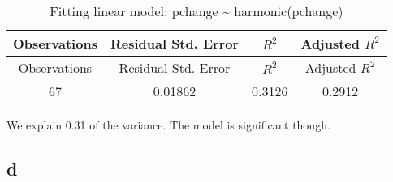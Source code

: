 \documentclass[]{book}
\theoremstyle{definition}
\theoremstyle{definition}
\theoremstyle{remark}
\begin{document}
\begin{longtable}[c]{@{}cccc@{}}
\caption{Fitting linear model: pchange \textasciitilde{}
harmonic(pchange)}\tabularnewline
\toprule
\begin{minipage}[b]{0.18\columnwidth}\centering\strut
Observations
\strut\end{minipage} &
\begin{minipage}[b]{0.27\columnwidth}\centering\strut
Residual Std. Error
\strut\end{minipage} &
\begin{minipage}[b]{0.10\columnwidth}\centering\strut
\(R^2\)
\strut\end{minipage} &
\begin{minipage}[b]{0.20\columnwidth}\centering\strut
Adjusted \(R^2\)
\strut\end{minipage}\tabularnewline
\midrule
\endfirsthead
\toprule
\begin{minipage}[b]{0.18\columnwidth}\centering\strut
Observations
\strut\end{minipage} &
\begin{minipage}[b]{0.27\columnwidth}\centering\strut
Residual Std. Error
\strut\end{minipage} &
\begin{minipage}[b]{0.10\columnwidth}\centering\strut
\(R^2\)
\strut\end{minipage} &
\begin{minipage}[b]{0.20\columnwidth}\centering\strut
Adjusted \(R^2\)
\strut\end{minipage}\tabularnewline
\midrule
\endhead
\begin{minipage}[t]{0.18\columnwidth}\centering\strut
67
\strut\end{minipage} &
\begin{minipage}[t]{0.27\columnwidth}\centering\strut
0.01862
\strut\end{minipage} &
\begin{minipage}[t]{0.10\columnwidth}\centering\strut
0.3126
\strut\end{minipage} &
\begin{minipage}[t]{0.20\columnwidth}\centering\strut
0.2912
\strut\end{minipage}\tabularnewline
\bottomrule
\end{longtable}

We explain 0.31 of the variance. The model is significant though.

\subsection*{d}\label{d-5}
\end{document}

